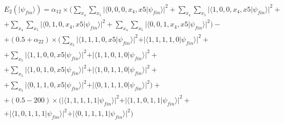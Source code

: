 \begin{equation}
\begin{split}
E_{2}(\vert\psi_{fin}\rangle)=\alpha_{12}\times(\sum_{x_{4}}\sum_{x_{5}}\vert\langle0,0,0,x_{4},x{5}\vert\psi_{fin}\rangle\vert^{2} + \sum_{x_{4}}\sum_{x_{5}}\vert\langle1,0,0,x_{4},x{5}\vert\psi_{fin}\rangle\vert^{2} + \\ 
+ \sum_{x_{4}}\sum_{x_{5}}\vert\langle0,1,0,x_{4},x{5}\vert\psi_{fin}\rangle\vert^{2}
+ \sum_{x_{4}}\sum_{x_{5}}\vert\langle0,0,1,x_{4},x{5}\vert\psi_{fin}\rangle\vert^{2}
 ) - \\
 + (0.5 + \alpha_{22})\times(\sum_{x_{5}}\vert\langle1,1,1,0,x{5}\vert\psi_{fin}\rangle\vert^{2} + \vert\langle1,1,1,1,0\vert\psi_{fin}\rangle\vert^{2} + \\ + \sum_{x_{5}}\vert\langle1,1,0,0,x{5}\vert\psi_{fin}\rangle\vert^{2}+ \vert\langle1,1,0,1,0\vert\psi_{fin}\rangle\vert^{2} + \\ 
+ \sum_{x_{5}}\vert\langle1,0,1,0,x{5}\vert\psi_{fin}\rangle\vert^{2} + \vert\langle1,0,1,1,0\vert\psi_{fin}\rangle\vert^{2}
+ \\ + \sum_{x_{5}}\vert\langle0,1,1,0,x{5}\vert\psi_{fin}\rangle\vert^{2} + \vert\langle0,1,1,1,0\vert\psi_{fin}\rangle\vert^{2}
 ) + \\ 
+(0.5-200)\times(\vert\langle1,1,1,1,1\vert\psi_{fin}\rangle\vert^{2} + \vert\langle1,1,0,1,1\vert\psi_{fin}\rangle\vert^{2} + \\ 
+ \vert\langle1,0,1,1,1\vert\psi_{fin}\rangle\vert^{2}
+ \vert\langle0,1,1,1,1\vert\psi_{fin}\rangle\vert^{2}
 )
\end{split}
\label{eq:pirates_payoff32:2}
\end{equation}

